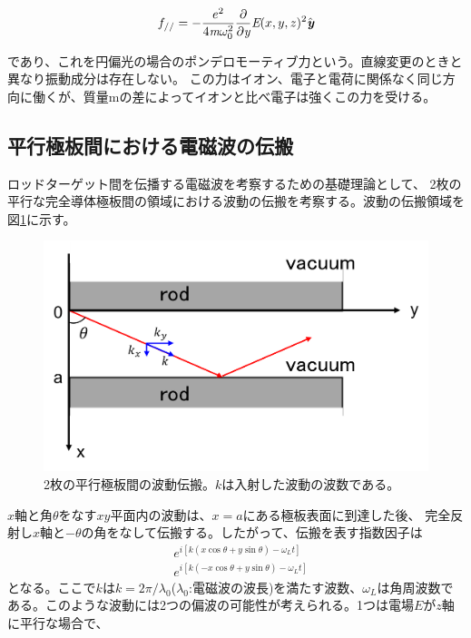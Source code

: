 \documentclass[a4paper,11pt,titlepage]{jarticle}
\numberwithin{equation}{section} %
\begin{document}
  \begin{eqnarray}
    f_{//}=- \frac{e^2 }{4 \textit{m} \omega _0^2}  \frac{\partial }{\partial \textit{y}}\textit{E}(x,y,z)^2 \hat{\textit{\textbf{y}}}
  \end{eqnarray}
  
  であり、これを円偏光の場合のポンデロモーティブ力という。直線変更のときと異なり振動成分は存在しない。
  この力はイオン、電子と電荷に関係なく同じ方向に働くが、質量mの差によってイオンと比べ電子は強くこの力を受ける。
  

  \subsection{平行極板間における電磁波の伝搬}
  ロッドターゲット間を伝播する電磁波を考察するための基礎理論として、
  2枚の平行な完全導体極板間の領域における波動の伝搬を考察する。波動の伝搬領域を図\ref{fig:2-5_導波管}に示す。
  \begin{figure}[H]
    \begin{center}
      \includegraphics[scale=0.6]{./image/2-5/2-5_導波管.png}
      \caption{
        \label{fig:2-5_導波管}
        2枚の平行極板間の波動伝搬。$k$は入射した波動の波数である。
      }
    \end{center}
  \end{figure} 
  $x$軸と角$\theta$をなす$xy$平面内の波動は、$x=a$にある極板表面に到達した後、
  完全反射し$x$軸と$-\theta$の角をなして伝搬する。したがって、伝搬を表す指数因子は
  \begin{eqnarray}
    \label{eq:2-5-1}
    & e^{i[k(x \cos \theta + y \sin \theta ) - \omega_L t ] }  \nonumber \\
    & e^{i[k( - x \cos \theta + y \sin \theta ) - \omega_L t ] }
  \end{eqnarray}
  となる。ここで$k$は$k=2\pi/\lambda_0$($\lambda_0$:電磁波の波長)を満たす波数、$\omega_L$は角周波数である。このような波動には2つの偏波の可能性が考えられる。1つは電場$E$が$z$軸に平行な場合で、
\end{document}
